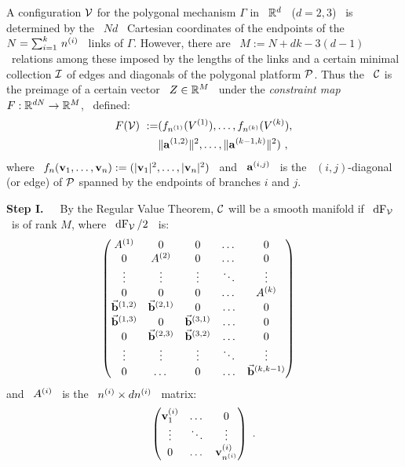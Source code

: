 A configuration $\mathcal{V}$ for the polygonal mechanism $\Gamma$ in \
$\mathbb{R}^{d}$ \ ($d=2,3$) \ is determined by the \ $Nd$ \ Cartesian
coordinates of the endpoints of the \ $N=\sum_{i=1}^{k}\,n\sp{({i})}$ \
links of $\Gamma$. However, there are \ $M:=N+dk-3(d-1)$ \
relations among these imposed by the lengths of the links and a
certain minimal collection $\mathcal{I}$ of edges and diagonals of the
polygonal platform $\mathcal{P}$. Thus the \cspace\ $\mathcal{C}$ is the preimage
of a certain vector \ $Z\in\mathbb{R}^{M}$ \ under the \emph{constraint
map}  \ $F:\mathbb{R}^{dN}\to\mathbb{R}^{M}$, \ defined:
%
\begin{equation}\label{econstr}
\begin{split}
%
F(\Vc)~:=&(f_{\nj{1}}(\Vj{1}),\dotsc,f_{\nj{k}}(\Vj{k}),\\
&\|\aj{1,2}\|^{2},\dotsc,\|\aj{k-1,k}\|^{2})~,
%
\end{split}
\end{equation}
%
where \
$f_{n}(\mathbf{v}_{1},\dotsc,\mathbf{v}_{n}):=(|\mathbf{v}_{1}|^{2},\dotsc,|\mathbf{v}_{n}|^{2})$ \
and \ $\mathbf{a}\sp{({i,j})}$ \ is the \ $(i,j)$-diagonal (or edge) of $\mathcal{P}$
spanned by the endpoints of branches $i$ and $j$\vsm.

\noindent\textbf{Step I.}~~~By the Regular Value Theorem, $\mathcal{C}$ will be
a smooth manifold if \ $\operatorname{dF}_{\mathcal{V}}$ \ is of rank $M$, where \
$\operatorname{dF}_{\mathcal{V}}/2$ \ is:
%
\begin{equation}\label{edf}
%
\begin{pmatrix}
%
A\up{1}    & 0         &  0           & \dotsc  & 0        \\
 0         & A\up{2}   &  0           & \dotsc  & 0        \\
 \vdots    & \vdots    &  \vdots      & \ddots  & \vdots   \\
 0         & 0         &  0           & \dotsc  & A\up{k}  \\
\bj{1}{2}  & \bj{2}{1} & 0            & \ldots  & 0        \\
\bj{1}{3}  & 0         & \bj{3}{1}    & \ldots  & 0        \\
 0         & \bj{2}{3} & \bj{3}{2}    & \ldots  & 0        \\
\vdots     & \vdots    &  \vdots      & \ddots  & \vdots \\
 0         & \dotsc    & 0            & \ldots  & \bj{k}{k-1}
\end{pmatrix}\vspace{4mm}\quad
%
\end{equation}
%
and \ $A\sp{({i})}$ \ is the \ $n\sp{({i})}\times dn\sp{({i})}$ \ matrix:
%
\begin{equation}\label{eai}
\begin{pmatrix}
%
\vj{i}_{1} & \dotsc    & 0              \\
\vdots     & \ddots    & \vdots         \\
0          & \dotsc    & \vj{i}_{\nj{i}}
\end{pmatrix}~.
%
\end{equation}

